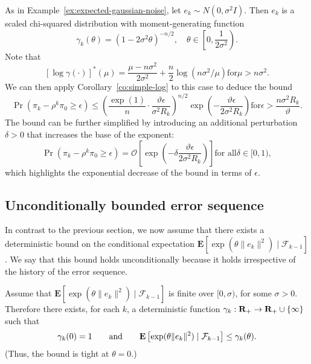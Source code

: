 \begin{example}
  \label{ex:expected-gaussian-noise-2}
  As in Example~\ref{ex:expected-gaussian-noise}, let
  $e_k\sim N(0,\sigma^2 I)$. Then $e_k$ is a scaled chi-squared
  distribution with moment-generating function
  \[
  \gamma_k(\theta) = (1-2\sigma^2 \theta)^{-n/2},
  \quad
  \theta \in \left[0,\frac1{2\sigma^2}\right).
  \]
  Note that
  \[
  [\log\gamma(\cdot)]^*(\mu)
  = \frac{\mu-n\sigma^{2}}{2\sigma^{2}}+\frac{n}{2}\log(n\sigma^{2}/\mu)
  \text{for}
  \mu > n\sigma^{2}.
  \]
  We can then apply Corollary~\ref{co:simple-log} to this case to
  deduce the bound
  \[
  \Pr(\pi_k-\rho^k\pi_0\ge \epsilon)
  \le
  \left(\frac{\exp(1)}{n}\cdot\frac{\vartheta\epsilon}{\sigma^{2} R_k}\right)^{n/2}\!\!
  \exp\left(-\frac{\vartheta\epsilon}{2 \sigma^{2} R_k}\right)
  \text{for}
  \epsilon>\frac{n\sigma^{2} R_k}{\vartheta}.
  \]
  The bound can be further simplified by introducing an additional
  perturbation $\delta>0$ that increases the base of the exponent:
  \begin{equation}\label{eq:13}
  \Pr(\pi_k-\rho^k\pi_0\ge \epsilon) =
  \mathcal{O}\left[\exp\left(-\delta\frac{\vartheta\epsilon}{2 \sigma^{2}
        R_k}\right)\right] \text{for all} \mbox{$\delta\in[0,1)$},
  \end{equation}
  which highlights the exponential decrease of the bound in terms of
  $\epsilon$.

  
\end{example}

\subsection{Unconditionally bounded error sequence} \label{ubes}

In contrast to the previous section, we now assume that there exists a
deterministic bound on the conditional expectation
$\mathbf{E}\left[\exp(\theta\|e_k\|^2)\mid\mathcal{F}_{k-1}\right]$. We say that this
bound holds unconditionally because it holds irrespective of the
history of the error sequence.

\begin{lem} \label{as:unconditional errors} Assume that
  $\mathbf{E}\left[\exp(\theta\|e_k\|^2)\mid\mathcal{F}_{k-1}\right]$ is finite over
  $[0,\sigma)$, for some $\sigma>0$. Therefore there exists, for each
  $k$, a deterministic function
  $\gamma_k:\mathbf{R}_{+}\to\mathbf{R}_{+}\cup\{\infty\}$ such that
  \[
  \gamma_k(0)=1
  \qquad 
  \text{\normalfont and}
  \qquad 
  \mathbf{E}\left[\exp(\theta\|e_k\|^2)\mid\mathcal{F}_{k-1}\right]\le\gamma_k(\theta).
  \]
  (Thus, the bound is tight at $\theta=0$.)
\end{lem}

